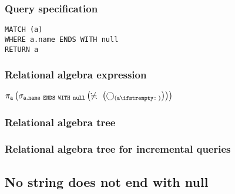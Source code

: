 \subsubsection*{Query specification}

\begin{lstlisting}
MATCH (a)
WHERE a.name ENDS WITH null
RETURN a
\end{lstlisting}

\subsubsection*{Relational algebra expression}

$\projection{\var{a}} \left(\selection{\mathtt{a.name~ENDS~WITH~null}} \left(\alldifferent{} \left(\getvertices{a}{}\right)\right)\right)$

\subsubsection*{Relational algebra tree}


\subsubsection*{Relational algebra tree for incremental queries}


\subsection{No string does not end with null}

